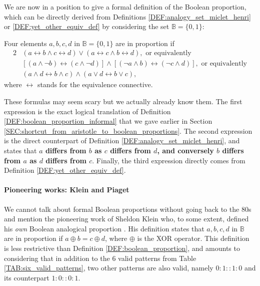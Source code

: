 We are now in a position to give a formal definition of the Boolean proportion,
which can be directly derived from Definitions
\ref{DEF:analogy_set_miclet_henri} or \ref{DEF:yet_other_equiv_def} by
considering the set $\mathbb{B} = \{0, 1\}$:

\begin{definition}
  \label{DEF:boolean_proportion}
  Four elements $a, b, c, d$ in $\mathbb{B} = \{0, 1\}$ are in proportion if
  \begin{alignat*}{2}
    &(a \leftrightarrow b \wedge c \leftrightarrow d)  \vee (a
    \leftrightarrow c \wedge b \leftrightarrow d), \text{ or equivalently}\\
    &\left[(a \wedge \neg b) \leftrightarrow (c \wedge \neg d)\right]  \wedge
    \left[(\neg a \wedge b)\leftrightarrow (\neg c \wedge d)\right], \text{ or equivalently}\\
     & (a \wedge d \leftrightarrow b \wedge c) \wedge (a \vee  d
    \leftrightarrow b \vee c),
  \end{alignat*}
  where $\leftrightarrow$ stands for the equivalence connective.
\end{definition}

These formulas may seem scary but we actually already know them. The first
expression is the exact logical translation of Definition
\ref{DEF:boolean_proportion_informal}  that we gave earlier in Section
\ref{SEC:shortcut_from_aristotle_to_boolean_proportions}. The second expression
is the direct counterpart of Definition \ref{DEF:analogy_set_miclet_henri},
and states that \textbf{$a$ differs from $b$ as $c$ differs from $d$, and
conversely $b$ differs from $a$ as $d$ differs from $c$}.  Finally, the third
expression directly comes from Definition \ref{DEF:yet_other_equiv_def}.

\paragraph{Pioneering works: Klein and Piaget\\}

We cannot talk about formal Boolean proportions without going back to the 80s
and mention the pioneering work of Sheldon Klein who, to some extent, defined
his \textit{own} Boolean analogical proportion \cite{Kle83}. His definition
states that $a, b, c, d$ in $\mathbb{B}$ are in proportion if $a \oplus b = c
\oplus d$, where $\oplus$ is the XOR operator.  This definition is less
restrictive than Definition \ref{DEF:boolean_proportion}, and amounts to
considering that in addition to the $6$ valid patterns from Table
\ref{TAB:six_valid_patterns}, two other patterns are also valid, namely
$0:1::1:0$ and its counterpart $1:0::0:1$.

